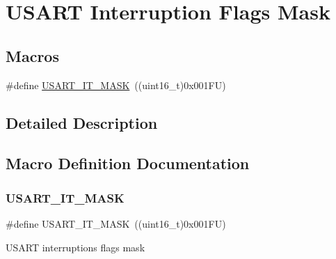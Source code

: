 \hypertarget{group___u_s_a_r_t___interruption___mask}{}\section{U\+S\+A\+RT Interruption Flags Mask}
\label{group___u_s_a_r_t___interruption___mask}
\subsection*{Macros}
\begin{DoxyCompactItemize}
\item 
\#define \hyperlink{group___u_s_a_r_t___interruption___mask_ga034341c78baf4241878310a22ec76a06}{U\+S\+A\+R\+T\+\_\+\+I\+T\+\_\+\+M\+A\+SK}~((uint16\+\_\+t)0x001\+F\+U)
\end{DoxyCompactItemize}


\subsection{Detailed Description}


\subsection{Macro Definition Documentation}
\mbox{\label{group___u_s_a_r_t___interruption___mask_ga034341c78baf4241878310a22ec76a06}} 
\subsubsection{\texorpdfstring{U\+S\+A\+R\+T\+\_\+\+I\+T\+\_\+\+M\+A\+SK}{USART\_IT\_MASK}}
{\footnotesize\ttfamily \#define U\+S\+A\+R\+T\+\_\+\+I\+T\+\_\+\+M\+A\+SK~((uint16\+\_\+t)0x001\+F\+U)}

U\+S\+A\+RT interruptions flags mask 